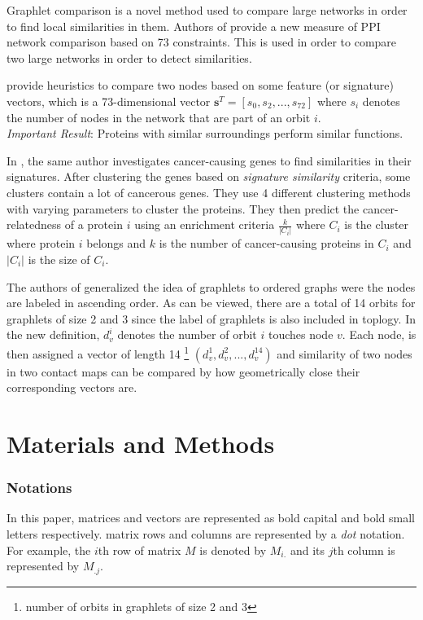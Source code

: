 \documentclass[a4,center,fleqn]{NAR}
\begin{document}
Graphlet comparison is a novel method used to compare large networks in order to
find local similarities in them.
Authors of \cite{prvzulj2007biological} provide a new measure of PPI
network comparison
based on 73 constraints. This is used in order to compare two large
networks in order to detect similarities.

\cite{milenkoviae2008uncovering} 
 provide heuristics to compare two nodes based on some feature
(or signature) vectors, which is a 73-dimensional vector
$\mathbf{s}^T
= [s_0, s_2, ..., s_{72}]$ where $s_i$ denotes the number of nodes in
the network that are part of an orbit $i$. \\
\textit{Important Result}: Proteins with similar surroundings perform
similar functions.

In \cite{milenkovic2010cancer}, the same author investigates 
cancer-causing genes to find similarities in their signatures. After
clustering the genes based on \textit{signature similarity} criteria,
some clusters contain a lot of cancerous genes.
They use 4 different clustering methods with varying parameters to cluster
the proteins. They then predict the cancer-relatedness of a protein 
$i$ using
an enrichment criteria $\frac{k}{|C_i|}$ where $C_i$ is the cluster
where protein $i$ belongs and $k$ is the number of cancer-causing
proteins in $C_i$ and $|C_i|$ is the size of $C_i$.


The authors of \cite{di2010fast} generalized the idea of graphlets to 
ordered graphs were the nodes are labeled in ascending order.
As can be viewed, there are a total of 14 orbits for graphlets of size
2 and 3 since the label of graphlets is also included in toplogy.
In the new definition, $d_v^i$ denotes the number of orbit $i$ touches 
node $v$. Each node, is then assigned a vector of length 14 
\footnote{number of orbits in graphlets of size 2 and 3}
$(d_v^1, d_v^2, ..., d_v^{14})$ 
and similarity of two nodes in two contact maps can be compared by
how geometrically close their corresponding vectors are.
\section{Materials and Methods}
\subsubsection{Notations}
In this paper, matrices and vectors are represented as bold
capital and bold small letters respectively.
matrix rows and columns are represented by a \textit{dot}
notation. For example, the $i$th row of matrix $M$ is
denoted by $M_{i.}$ and its $j$th column is represented
by $M_{.j}$.
\end{document}
